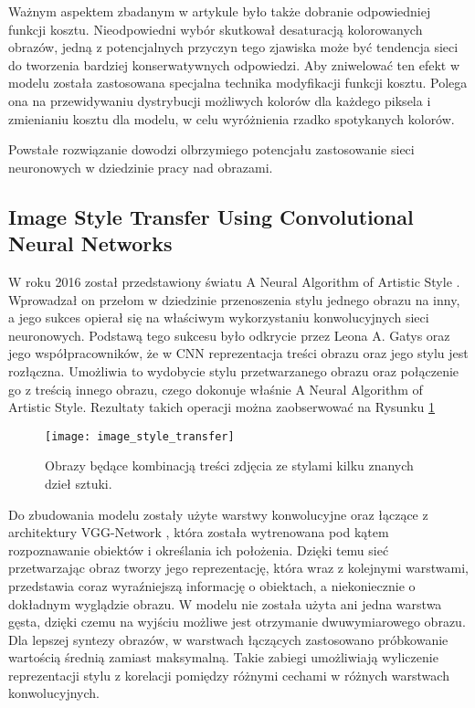     Ważnym aspektem zbadanym w artykule było także dobranie odpowiedniej
    funkcji kosztu. Nieodpowiedni wybór skutkował desaturacją kolorowanych
    obrazów, jedną z potencjalnych przyczyn tego zjawiska może być tendencja
    sieci do tworzenia bardziej konserwatywnych odpowiedzi. Aby zniwelować ten
    efekt w modelu została zastosowana specjalna technika modyfikacji
    funkcji kosztu. Polega ona na przewidywaniu dystrybucji możliwych kolorów
    dla każdego piksela i zmienianiu kosztu dla modelu, w celu wyróżnienia rzadko
    spotykanych kolorów.

    Powstałe rozwiązanie dowodzi olbrzymiego potencjału zastosowanie sieci
    neuronowych w dziedzinie pracy nad obrazami.

  \subsection{Image Style Transfer Using Convolutional Neural Networks}
    W roku 2016 został przedstawiony światu A Neural Algorithm of Artistic Style
    \cite{image_style_transfer}. Wprowadzał on przełom w dziedzinie przenoszenia
    stylu jednego obrazu na inny, a jego sukces opierał się na właściwym wykorzystaniu
    konwolucyjnych sieci neuronowych. Podstawą tego sukcesu było odkrycie przez
    Leona A. Gatys oraz jego współpracowników, że w CNN reprezentacja treści
    obrazu oraz jego stylu jest rozłączna. Umożliwia to wydobycie stylu
    przetwarzanego obrazu oraz połączenie go z treścią innego obrazu, czego
    dokonuje właśnie A Neural Algorithm of Artistic Style. Rezultaty takich
    operacji można zaobserwować na Rysunku \ref{fig:image_style_transfer}

    \begin{figure}[ht]
      \centering
      \texttt{[image: image\_style\_transfer]}
      \caption[Obrazy będące kombinacją treści zdjęcia ze stylami kilku znanych dzieł sztuki - źródło:
      \cite{image_style_transfer}]
      {Obrazy będące kombinacją treści zdjęcia ze stylami kilku znanych dzieł sztuki.}
      \label{fig:image_style_transfer}
    \end{figure}

    Do zbudowania modelu zostały użyte warstwy konwolucyjne oraz łączące z
    architektury VGG-Network \cite{vgg_network}, która została wytrenowana pod
    kątem rozpoznawanie obiektów i określania ich położenia. Dzięki temu sieć
    przetwarzając obraz tworzy jego reprezentację, która wraz z
    kolejnymi warstwami, przedstawia coraz wyraźniejszą informację o obiektach,
    a niekoniecznie o dokładnym wyglądzie obrazu.
    W modelu nie została użyta ani jedna warstwa gęsta, dzięki czemu na wyjściu
    możliwe jest otrzymanie dwuwymiarowego obrazu.
    Dla lepszej syntezy obrazów, w warstwach
    łączących zastosowano próbkowanie wartością średnią zamiast maksymalną.
    Takie zabiegi umożliwiają wyliczenie reprezentacji stylu z korelacji
    pomiędzy różnymi cechami w różnych warstwach konwolucyjnych.

